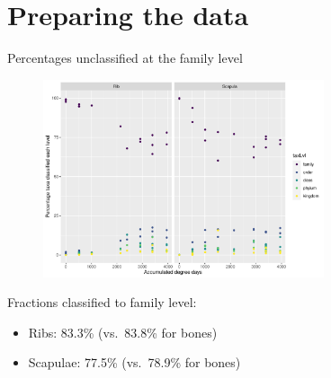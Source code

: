 \documentclass{beamer}
\date{August 2021}
\begin{document}









\section[Preparation]{Preparing the data}



\begin{frame}{Percentages unclassified at the family level}

  \begin{center}
    \begin{figure}
      \includegraphics[width=3.25in]{swabs_family_perc_classif_by_add_type}
    \end{figure}
  \end{center}
  \vspace{-0.1in}
  {\footnotesize
  Fractions classified to family level:
  \begin{itemize}
    \item Ribs: 83.3\% (vs.\ 83.8\% for bones)
    \item Scapulae: 77.5\% (vs.\ 78.9\% for bones)
  \end{itemize}
  }
\end{frame}
\end{document}

